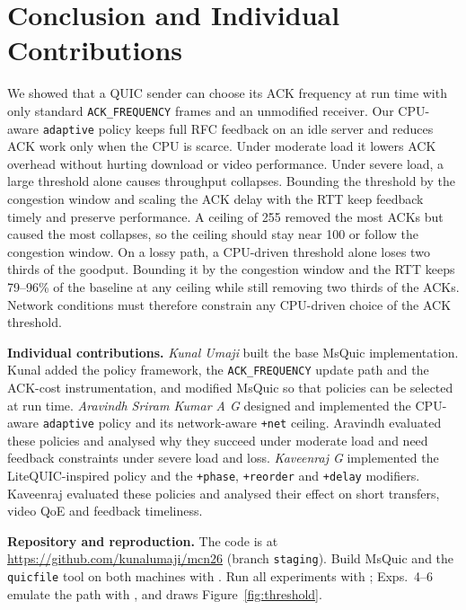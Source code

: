 \documentclass[11pt]{article}
\newcommand{\pol}[1]{\texttt{#1}}            %
\newcommand{\para}[1]{\textbf{#1}} %
\begin{document}
\section{Conclusion and Individual Contributions}
We showed that a QUIC sender can choose its ACK frequency at run time with only standard
\pol{ACK\_FREQUENCY} frames and an unmodified receiver. Our CPU-aware \pol{adaptive} policy keeps
full RFC feedback on an idle server and reduces ACK work only when the CPU is scarce. Under moderate
load it lowers ACK overhead without hurting download or video performance. Under severe load, a
large threshold alone causes throughput collapses. Bounding the threshold by the congestion window
and scaling the ACK delay with the RTT keep feedback timely and preserve performance. A ceiling of
255 removed the most ACKs but caused the most collapses, so the ceiling should stay near 100 or
follow the congestion window. On a
lossy path, a CPU-driven threshold alone loses two thirds of the goodput. Bounding it by the
congestion window and the RTT keeps 79--96\% of the baseline at any ceiling while still removing
two thirds of the ACKs. Network conditions must therefore constrain any CPU-driven choice of the ACK threshold.

\para{Individual contributions.} \emph{Kunal Umaji} built the base MsQuic implementation. Kunal
added the policy framework, the \pol{ACK\_FREQUENCY} update path and the ACK-cost instrumentation,
and modified MsQuic so that policies can be selected at run time. \emph{Aravindh Sriram Kumar A G}
designed and implemented the CPU-aware \pol{adaptive} policy and its network-aware \pol{+net}
ceiling. Aravindh evaluated these policies and analysed why they succeed under moderate load and
need feedback constraints under severe load and loss. \emph{Kaveenraj G} implemented the
LiteQUIC-inspired policy and the \pol{+phase}, \pol{+reorder} and \pol{+delay} modifiers. Kaveenraj
evaluated these policies and analysed their effect on short transfers, video QoE and feedback
timeliness.

\para{Repository and reproduction.} The code is at \url{https://github.com/kunalumaji/mcn26}
(branch \pol{staging}). Build MsQuic and the \pol{quicfile} tool on both machines with
. Run all experiments with ; Exps.~4--6 emulate the path with
, and  draws Figure~\ref{fig:threshold}.
\end{document}
